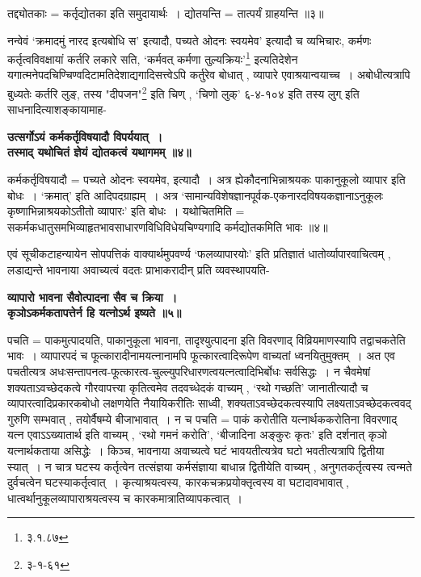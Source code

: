 तद्द्योतकाः = कर्तृद्योतका इति समुदायार्थः~।
द्योतयन्ति = तात्पर्यं ग्राहयन्ति ॥३॥\par
नन्वेवं `क्रमादमुं नारद इत्यबोधि स' इत्यादौ, पच्यते ओदनः स्वयमेव' इत्यादौ च व्यभिचारः, कर्मणः कर्तृत्वविवक्षायां कर्तरि लकारे सति, `कर्मवत् कर्मणा तुल्यक्रियः'\footnote{३.१.८७} इत्यतिदेशेन यगात्मनेपदचिण्चिण्वदिटामतिदेशाद्यगादिसत्त्वेऽपि कर्तुरेव बोधात् , व्यापारे एवाश्रयान्वयाच्च~।
अबोधीत्यत्रापि बुध्यतेः कर्तरि लुङ्, तस्य "दीपजन"\footnote{३-१-६१} इति चिण् , `चिणो लुक्' {६-४-१०४} इति तस्य लुग् इति साधनादित्याशङ्कायामाह-
\begin{center}
{\bfseries उत्सर्गोऽयं कर्मकर्तृविषयादौ विपर्ययात्~।\\
 तस्माद् यथोचितं ज्ञेयं द्योतकत्वं यथागमम् ॥४॥}
\end{center}
 कर्मकर्तृविषयादौ = पच्यते ओदनः स्वयमेव, इत्यादौ~।
अत्र ह्येकौदनाभिन्नाश्रयकः पाकानुकूलो व्यापार इति बोधः~।
`क्रमात्' इति आदिपदग्राह्यम्~।
अत्र `सामान्यविशेषज्ञानपूर्वक-एकनारदविषयकज्ञानाऽनुकूलः कृष्णाभिन्नाश्रयकोऽतीतो व्यापारः' इति बोधः~।
यथोचितमिति = सकर्मकधातुसमभिव्याहृतभावसाधारणविधिविधेयचिण्यगादि कर्मद्योतकमिति भावः ॥४॥\par
एवं सूचीकटाहन्यायेन सोपपत्तिकं वाक्यार्थमुपवर्ण्य `फलव्यापारयोः' इति प्रतिज्ञातं धातोर्व्यापारवाचित्वम् , लडाद्यन्ते भावनाया अवाच्यत्वं वदतः प्राभाकरादीन् प्रति व्यवस्थापयति-
\begin{center}
{\bfseries व्यापारो भावना सैवोत्पादना सैव च क्रिया~।\\
कृञोऽकर्मकतापत्तेर्न हि यत्नोऽर्थ इष्यते ॥५॥}
\end{center}
पचति = पाकमुत्पादयति, पाकानुकूला भावना, तादृश्युत्पादना इति विवरणाद् विव्रियमाणस्यापि तद्वाचकतेति भावः~।
व्यापारपदं च फूत्कारादीनामयत्नानामपि फूत्कारत्वादिरूपेण वाच्यतां ध्वनयितुमुक्तम्~।
अत एव पचतीत्यत्र अधःसन्तापनत्व-फूत्कारत्व-चुल्ल्युपरिधारणत्वयत्नत्वादिभिर्बोधः सर्वसिद्धः~।
न चैवमेषां शक्यताऽवच्छेदकत्वे गौरवापत्त्या कृतित्वमेव तदवच्धेदकं वाच्यम् , `रथो गच्छति' जानातीत्यादौ च व्यापारत्वादिप्रकारकबोधो लक्षणयेति नैयायिकरीतिः साध्वी, शक्यताऽवच्छेदकत्वस्यापि लक्ष्यताऽवच्छेदकत्ववद् गुरुणि सम्भवात् , तयोर्वैषम्ये बीजाभावात्~।
न च पचति = पाकं करोतीति यत्नार्थककरोतिना विवरणाद् यत्न एवाऽऽख्यातार्थ इति वाच्यम् ,
`रथो गमनं करोति', ‘बीजादिना अङ्कुरः कृतः' इति दर्शनात् कृञो यत्नार्थकताया असिद्धेः~।
किञ्च, भावनाया अवाच्यत्वे घटं भावयतीत्यत्रेव घटो भवतीत्यत्रापि द्वितीया स्यात्~।
न चात्र घटस्य कर्तृत्वेन तत्संज्ञया कर्मसंज्ञाया बाधान्न द्वितीयेति वाच्यम् , अनुगतकर्तृत्वस्य त्वन्मते दुर्वचत्वेन घटस्याकर्तृत्वात्~।
कृत्याश्रयत्वस्य, कारकचक्रप्रयोक्तृत्वस्य वा घटादावभावात् , धात्वर्थानुकूलव्यापाराश्रयत्वस्य च कारकमात्रातिव्यापकत्वात्~।
